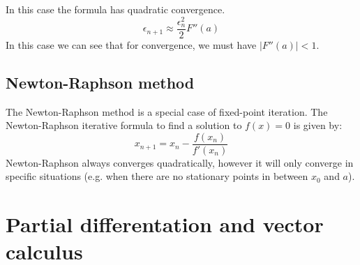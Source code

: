\documentclass{scrartcl}
\begin{document}
In this case the formula has quadratic convergence.
\begin{equation}
\epsilon_{n+1} \approx \frac{\epsilon_{n}^{2}}{2} F''(a)
\end{equation}
In this case we can see that for convergence, we must have $ |F''(a)| < 1 $.

\subsection{Newton-Raphson method}

The Newton-Raphson method is a special case of fixed-point iteration. The Newton-Raphson iterative formula to find a solution to $ f(x) = 0 $ is given by:
\begin{equation}
x_{n+1} =x_{n} - \frac{f(x_{n})}{f'(x_{n})}
\end{equation}
Newton-Raphson always converges quadratically, however it will only converge in specific situations (e.g. when there are no stationary points in between $ x_{0} $ and $ a $).

\section{Partial differentation and vector calculus}
\end{document}
